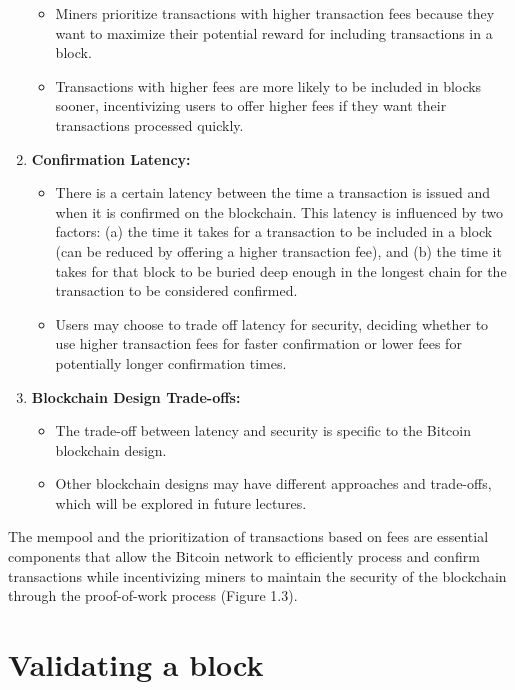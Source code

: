\begin{enumerate}
\begin{itemize}
		\item Miners prioritize transactions with higher transaction fees because they want to maximize their potential reward for including transactions in a block.
		\item Transactions with higher fees are more likely to be included in blocks sooner, incentivizing users to offer higher fees if they want their transactions processed quickly.
	\end{itemize}
	\item \textbf{Confirmation Latency:}
	\begin{itemize}
		\item There is a certain latency between the time a transaction is issued and when it is confirmed on the blockchain. This latency is influenced by two factors: (a) the time it takes for a transaction to be included in a block (can be reduced by offering a higher transaction fee), and (b) the time it takes for that block to be buried deep enough in the longest chain for the transaction to be considered confirmed.
		\item Users may choose to trade off latency for security, deciding whether to use higher transaction fees for faster confirmation or lower fees for potentially longer confirmation times.
	\end{itemize}
	\item \textbf{Blockchain Design Trade-offs:}
	\begin{itemize}
		\item The trade-off between latency and security is specific to the Bitcoin blockchain design.
		\item Other blockchain designs may have different approaches and trade-offs, which will be explored in future lectures.
	\end{itemize}
\end{enumerate}
The mempool and the prioritization of transactions based on fees are essential components that allow the Bitcoin network to efficiently process and confirm transactions while incentivizing miners to maintain the security of the blockchain through the proof-of-work process (Figure 1.3).

\section{Validating a block}
